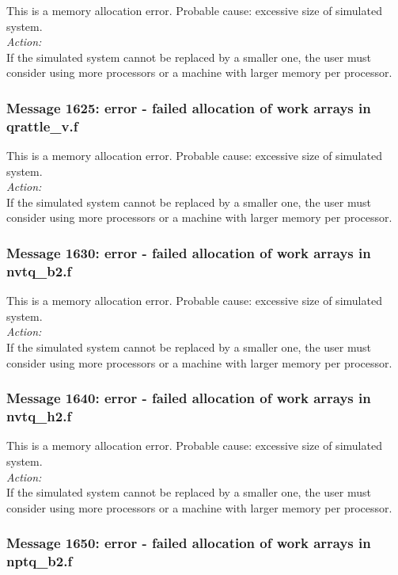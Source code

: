 This is a memory allocation error. Probable cause: excessive size of
simulated system. \\

\noindent
{\em Action:}\\
If the simulated system cannot be replaced by a smaller one, the user
must consider using more processors or a machine with larger memory
per processor.

\subsubsection*{Message 1625: error - failed allocation of work arrays
in qrattle\_v.f}

This is a memory allocation error. Probable cause: excessive size of
simulated system. \\

\noindent
{\em Action:}\\
If the simulated system cannot be replaced by a smaller one, the user
must consider using more processors or a machine with larger memory
per processor.

\subsubsection*{Message 1630: error - failed allocation of work arrays
in nvtq\_b2.f}

This is a memory allocation error. Probable cause: excessive size of
simulated system. \\

\noindent
{\em Action:}\\
If the simulated system cannot be replaced by a smaller one, the user
must consider using more processors or a machine with larger memory
per processor.

\subsubsection*{Message 1640: error - failed allocation of work arrays
in nvtq\_h2.f}

This is a memory allocation error. Probable cause: excessive size of
simulated system. \\

\noindent
{\em Action:}\\
If the simulated system cannot be replaced by a smaller one, the user
must consider using more processors or a machine with larger memory
per processor.

\subsubsection*{Message 1650: error - failed allocation of work arrays
in nptq\_b2.f}

